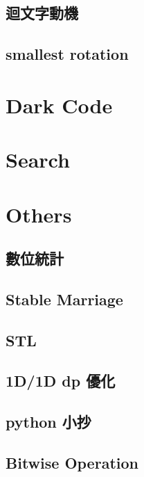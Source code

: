 \subsection{迴文字動機}

\subsection{smallest rotation}


\section{Dark Code}

%

\section{Search}


\section{Others}

\subsection{數位統計}

\subsection{Stable Marriage}

\subsection{STL}

\subsection{1D/1D dp 優化}

\subsection{python 小抄}

\subsection{Bitwise Operation}

